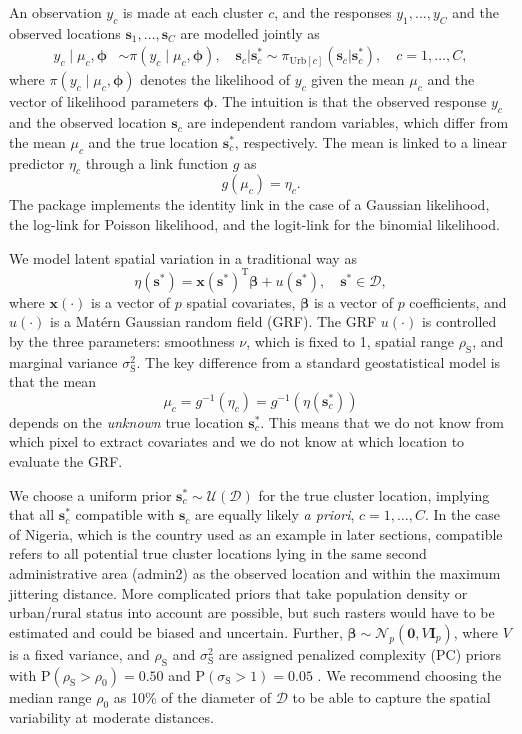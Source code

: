 An observation $y_c$ is made at each cluster $c$, and the responses $y_1, \ldots, y_C$ and the observed locations $\boldsymbol{s}_1, \ldots, \boldsymbol{s}_C$ are modelled jointly as
\begin{align}
y_c \mid \mu_c, \boldsymbol{\phi} &\sim \pi(y_c \mid \mu_c, \boldsymbol{\phi}),  \quad \boldsymbol{s}_c|\boldsymbol{s}_c^*\sim \pi_{\mathrm{Urb}[c]}(\boldsymbol{s}_c|\boldsymbol{s}_c^*), \quad c  = 1, \ldots, C, \label{eq:model}
\end{align}
where  $\pi(y_c \mid \mu_c, \boldsymbol{\phi})$ denotes the likelihood of $y_c$ given the mean $\mu_c$ and the vector of likelihood parameters $\boldsymbol{\phi}$. The intuition is that the observed response $y_c$ and the observed location $\boldsymbol{s}_c$ are independent random variables, which differ from the mean $\mu_c$ and the true location $\boldsymbol{s}_c^*$, respectively.  The mean is linked to a linear predictor $\eta_c$ through a link function $g$ as
\[
    g(\mu_c) = \eta_c.
\]
The package implements the identity link in the case of a Gaussian likelihood, the log-link for Poisson likelihood, and the logit-link for the binomial likelihood. 

We model latent spatial variation in a traditional way as
\[
    \eta(\boldsymbol{s}^*) = \boldsymbol{x}(\boldsymbol{s}^*)^\mathrm{T}\boldsymbol{\beta}+u(\boldsymbol{s}^*), \quad \boldsymbol{s}^* \in\mathcal{D},
\]
where $\boldsymbol{x}(\cdot)$ is a vector of $p$ spatial covariates, $\boldsymbol{\beta}$ is a vector of $p$ coefficients, and $u(\cdot)$ is a Matérn Gaussian random field (GRF). The GRF $u(\cdot)$ is controlled by the three parameters: smoothness $\nu$, which is fixed to 1, spatial range $\rho_\mathrm{S}$, and marginal variance $\sigma_\mathrm{S}^2$. The key difference from a standard geostatistical model is that the mean
\[
    \mu_c = g^{-1}(\eta_c) = g^{-1}(\eta(\boldsymbol{s}_c^*))
\]
 depends on the \emph{unknown} true location $\boldsymbol{s}_c^*$. This means that we do not know from which pixel to extract covariates and we do not know at which location to evaluate the GRF.

We choose a uniform prior $\boldsymbol{s}_c^*\sim \mathcal{U}(\mathcal{D})$ for the true cluster location, implying that all $\boldsymbol{s}_c^*$ compatible with $\boldsymbol{s}_c$ are equally likely \emph{a priori}, $c = 1, \ldots, C$.  In the case of Nigeria, which is the country used as an example in later sections, compatible refers to all potential true cluster locations lying in the same second administrative area (admin2) as the observed location and within the maximum jittering distance. More complicated priors that take population density or urban/rural status into account are possible, but such rasters would have to be estimated and could be biased and uncertain.
Further, $\boldsymbol{\beta}\sim\mathcal{N}_p(\boldsymbol{0},V \mathbf{I}_p)$, where $V$ is a fixed variance, and $\rho_\mathrm{S}$ and $\sigma_\mathrm{S}^2$ are assigned penalized complexity (PC) priors with $\mathrm{P}(\rho_\mathrm{S} > \rho_0) = 0.50$ and $\mathrm{P}(\sigma_\mathrm{S} > 1) = 0.05$ \citep{fuglstad:etal:19a}. We recommend choosing the median range $\rho_0$ as 10\% of the diameter of $\mathcal{D}$ to be able to capture the spatial variability at moderate distances. 

